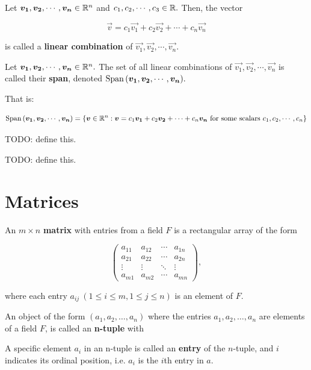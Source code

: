 \documentclass{article}
\begin{document}

\begin{definition}
Let $\boldsymbol{v_1}, \boldsymbol{v_2}, \cdots, \boldsymbol{v_n} \in \mathbb{R}^n$ and $c_1, c_2, \cdots, c_3 \in \mathbb{R}.$ Then, the \@{vector}

\[ \vec{v} = c_1 \vec{v_1} +  c_2 \vec{v_2} + \cdots + c_n \vec{v_n} \]

is called a \textbf{linear combination} of $\vec{v_1}, \vec{v_2}, \cdots, \vec{v_n}.$

Let $\boldsymbol{v_1}, \boldsymbol{v_2}, \cdots, \boldsymbol{v_n} \in \mathbb{R}^n.$ The set of all linear combinations of $\vec{v_1}, \vec{v_2}, \cdots, \vec{v_n}$ is called their \textbf{span}, denoted $\operatorname{Span}{\left(\boldsymbol{v_1}, \boldsymbol{v_2}, \cdots, \boldsymbol{v_n}\right)}.$ 

That is:

\[ \operatorname{Span}{\left(\boldsymbol{v_1}, \boldsymbol{v_2}, \cdots, \boldsymbol{v_n}\right)} = \left\{ \boldsymbol{v} \in \mathbb{R}^n : \boldsymbol{v} = c_1 \boldsymbol{v_1} + c_2 \boldsymbol{v_2} + \cdots + c_n \boldsymbol{v_n} ~ \text{for some scalars} ~ c_1, c_2, \cdots, c_n \right\} \]
\end{definition}

\begin{definition}
TODO: define this.
\end{definition}

\begin{definition}
TODO: define this.
\end{definition}

\section{Matrices}

\begin{definition}[Matrix]
	An $m \times n$ \textbf{matrix} with \@{entries} from a \@{field} $F$ is a rectangular array of the form

	\[ \begin{pmatrix}
	a_{11} & a_{12} & \cdots & a_{1n} \\
	a_{21} & a_{22} & \cdots & a_{2n} \\
	\vdots & \vdots & \ddots & \vdots \\
	a_{m1} & a_{m2} & \cdots & a_{mn}
	\end{pmatrix}, \]

	where each entry $a_{ij} ~ (1 \leq i \leq m, 1 \leq j \leq n)$ is an \@{element} of $F$.
\end{definition}

\begin{definition}[n-tuple]
	An object of the form $(a_1, a_2, \dots, a_n)$ where the \@{entries} $a_1, a_2, \dots, a_n$ are \@{elements} of a \@{field} $F$, is called an \textbf{n-tuple} with 
\end{definition}

\begin{definition}[Entry]
	A specific \@{element} $a_i$ in an \@{n-tuple} is called an \textbf{entry} of the $n$-tuple, and $i$ indicates its ordinal position, i.e. $a_i$ is the $i$th entry in $a.$
\end{definition}
\end{document}
